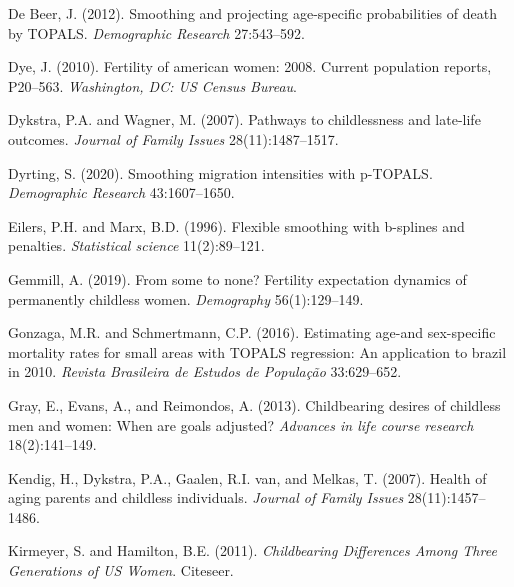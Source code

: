 \documentclass[
  11pt,
  letterpaper,
]{article}
\newlength{\cslhangindent}
\newlength{\cslentryspacingunit} %
\newenvironment{CSLReferences}[2] %
 {%
  \setlength{\parindent}{0pt}
  \ifodd #1
  \let\oldpar\par
  \def\par{\hangindent=\cslhangindent\oldpar}
  \fi
  \setlength{\parskip}{#2\cslentryspacingunit}
 }%
 {}
\begin{document}
\hypertarget{refs}{}
\begin{CSLReferences}{1}{0}
\leavevmode{}%
De Beer, J. (2012). Smoothing and projecting age-specific probabilities of death by TOPALS. \emph{Demographic Research} 27:543--592.

\leavevmode{}%
Dye, J. (2010). Fertility of american women: 2008. Current population reports, P20--563. \emph{Washington, DC: US Census Bureau}.

\leavevmode{}%
Dykstra, P.A. and Wagner, M. (2007). Pathways to childlessness and late-life outcomes. \emph{Journal of Family Issues} 28(11):1487--1517.

\leavevmode{}%
Dyrting, S. (2020). Smoothing migration intensities with p-TOPALS. \emph{Demographic Research} 43:1607--1650.

\leavevmode{}%
Eilers, P.H. and Marx, B.D. (1996). Flexible smoothing with b-splines and penalties. \emph{Statistical science} 11(2):89--121.

\leavevmode{}%
Gemmill, A. (2019). From some to none? Fertility expectation dynamics of permanently childless women. \emph{Demography} 56(1):129--149.

\leavevmode{}%
Gonzaga, M.R. and Schmertmann, C.P. (2016). Estimating age-and sex-specific mortality rates for small areas with TOPALS regression: An application to brazil in 2010. \emph{Revista Brasileira de Estudos de Popula{ç}{ã}o} 33:629--652.

\leavevmode{}%
Gray, E., Evans, A., and Reimondos, A. (2013). Childbearing desires of childless men and women: When are goals adjusted? \emph{Advances in life course research} 18(2):141--149.

\leavevmode{}%
Kendig, H., Dykstra, P.A., Gaalen, R.I. van, and Melkas, T. (2007). Health of aging parents and childless individuals. \emph{Journal of Family Issues} 28(11):1457--1486.

\leavevmode{}%
Kirmeyer, S. and Hamilton, B.E. (2011). \emph{Childbearing Differences Among Three Generations of US Women}. Citeseer.


\end{CSLReferences}
\end{document}
